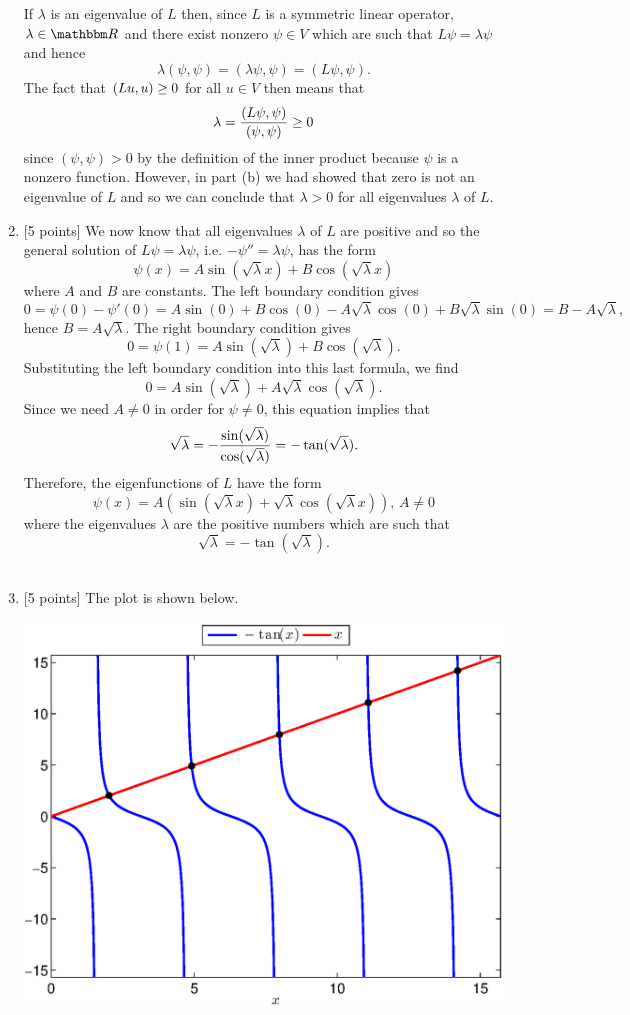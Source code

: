 \begin{solution}
\begin{enumerate}
If $\lambda$ is an eigenvalue of $L$ then, since $L$ is a symmetric linear operator, $\lambda\in\R$ and there exist nonzero $\psi\in V$ which are such that $L\psi=\lambda\psi$ and hence
\[
 \lambda(\psi,\psi) = ( \lambda\psi,\psi)= ( L\psi,\psi).
\]
The fact that $(Lu,u)\ge0$ for all $u\in V$ then means that
\[
 \lambda = {( L\psi,\psi) \over (\psi,\psi)}\ge0
\]
since $(\psi,\psi)>0$ by the definition of the inner product because $\psi$ is a nonzero function. However, in part (b) we had showed that zero is not an eigenvalue of $L$ and so we can conclude that $\lambda >0$ for all eigenvalues $\lambda$ of $L$.
\\
\item {[5 points]} We now know that all eigenvalues $\lambda$ of $L$ are positive and so the general solution of $L\psi = \lambda \psi$, i.e. $-\psi'' = \lambda \psi$, has the form
      \[
\psi(x) = A \sin(\sqrt{\lambda} x) + B \cos(\sqrt{\lambda} x)
\]
 where $A$ and $B$ are constants. The left boundary condition gives
      \[
0 = \psi(0) - \psi'(0) = A \sin(0) + B \cos(0)- A \sqrt{\lambda} \cos(0)+ B \sqrt{\lambda} \sin(0)= B - A \sqrt{\lambda},
\]
      hence $B = A \sqrt{\lambda}$.
      The right boundary condition gives
      \[
0 = \psi(1) = A \sin(\sqrt{\lambda}) + B \cos(\sqrt{\lambda}).
\]
      Substituting the left boundary condition into this last formula, we find
       \[ 
0 = A \sin(\sqrt{\lambda}) + A \sqrt{\lambda} \cos(\sqrt{\lambda}).
\]
Since we need $A\ne 0$ in order for $\psi\ne0$, this equation implies that
       \[ 
\sqrt{\lambda} = - {\sin(\sqrt{\lambda}) \over \cos(\sqrt{\lambda})}
                         = -\tan(\sqrt{\lambda}).
\]
Therefore, the eigenfunctions of $L$ have the form
\[
\psi(x) = A(\sin(\sqrt{\lambda} x) + \sqrt{\lambda}\cos(\sqrt{\lambda} x)),\, A\ne0
\]
where the eigenvalues $\lambda$ are the positive numbers which are such that
\[
\sqrt{\lambda} = -\tan(\sqrt{\lambda}).
\]
\\
\item {[5 points]} The plot is shown below.

\begin{center}
\includegraphics[scale=0.7]{eigroot}
\end{center}


\end{enumerate}
\end{solution}
